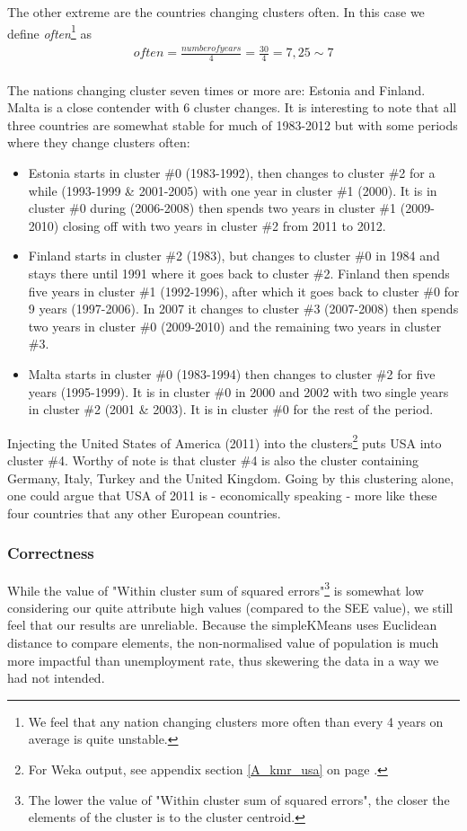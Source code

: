 The other extreme are the countries changing clusters often. In this case we define \textit{often}\footnote{We feel that any nation changing clusters more often than every 4 years on average is quite unstable.} as 
\begin{align*}
often = \frac{number of years}{4} = \frac{30}{4} = 7,25 \sim 7
\end{align*} 
\\The nations changing cluster seven times or more are: Estonia and Finland. Malta is a close contender with 6 cluster changes. It is interesting to note that all three countries are somewhat stable for much of 1983-2012 but with some periods where they change clusters often:

\begin{itemize}
\item Estonia starts in cluster \#0 (1983-1992), then changes to cluster \#2 for a while (1993-1999 \& 2001-2005) with one year in cluster \#1 (2000). It is in cluster \#0 during (2006-2008) then spends two years in cluster \#1 (2009-2010) closing off with two years in cluster \#2 from 2011 to 2012.
\item Finland starts in cluster \#2 (1983), but changes to cluster \#0 in 1984 and stays there until 1991 where it goes back to cluster \#2. Finland then spends five years in cluster \#1 (1992-1996), after which it goes back to cluster \#0 for 9 years (1997-2006). In 2007 it changes to cluster \#3 (2007-2008) then spends two years in cluster \#0 (2009-2010) and the remaining two years in cluster \#3.
\item Malta starts in cluster \#0 (1983-1994) then changes to cluster \#2 for five years (1995-1999). It is in cluster \#0 in 2000 and 2002 with two single years in cluster \#2 (2001 \& 2003). It is in cluster \#0 for the rest of the period.
\end{itemize}

Injecting the United States of America (2011) into the clusters\footnote{For Weka output, see appendix section \ref{A_kmr_usa} on page \pageref{A_kmr_usa}.} puts USA into cluster \#4. Worthy of note is that cluster \#4 is also the cluster containing Germany, Italy, Turkey and the United Kingdom. Going by this clustering alone, one could argue that USA of 2011 is - economically speaking - more like these four countries that any other European countries.

\subsubsection*{Correctness}
\label{Res_Clu_Cor}
While the value of "Within cluster sum of squared errors"\footnote{The lower the value of "Within cluster sum of squared errors", the closer the elements of the cluster is to the cluster centroid.} is somewhat low considering our quite attribute high values (compared to the SEE value), we still feel that our results are unreliable. Because the simpleKMeans uses Euclidean distance to compare elements, the non-normalised value of population is much more impactful than unemployment rate, thus skewering the data in a way we had not intended.